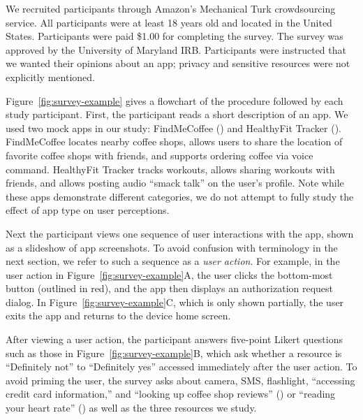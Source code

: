 We recruited participants through Amazon's Mechanical Turk
crowdsourcing service. All participants were at least 18 years old and
located in the United States. Participants were paid \$1.00 for
completing the survey. The survey was approved by the University 
of Maryland IRB. Participants were instructed that we
wanted their opinions about an app; privacy and sensitive resources
were not explicitly mentioned.

Figure~\ref{fig:survey-example} gives a flowchart of the procedure
followed by each study participant. First, the participant reads a
short description of an app.  We used two mock
apps in our study: FindMeCoffee (\coffee{}) and HealthyFit Tracker
(\fitness{}).  FindMeCoffee locates nearby coffee shops, allows
users to share the location of favorite coffee shops with friends, and
supports ordering coffee via voice command. HealthyFit Tracker tracks
workouts, allows sharing workouts with friends, and allows posting
audio ``smack talk'' on the user's profile. Note while these apps
demonstrate different categories, we do not attempt to fully study
the effect of app type on user perceptions.

Next the participant views one sequence of user interactions with the
app, shown as a
slideshow of app screenshots. To avoid confusion with terminology in
the next section, we refer to such a sequence as a \emph{user action}.
 For example, in the user action in
Figure~\ref{fig:survey-example}A, the user clicks the bottom-most
button (outlined in red), and the app then displays an authorization
request dialog. In Figure~\ref{fig:survey-example}C, which is only
shown partially, the user exits the app and returns to the device home
screen.

After viewing a user action,
the participant answers
five-point Likert questions such as those in Figure~\ref{fig:survey-example}B, which
ask whether a resource is ``Definitely not'' to ``Definitely
yes'' accessed immediately after the user action.
To avoid priming the user, the survey asks about 
camera,
SMS, flashlight, ``accessing
credit card information,'' and ``looking up coffee shop reviews'' (\coffee) 
or ``reading your heart rate'' (\fitness) as well as the 
three resources we study.

